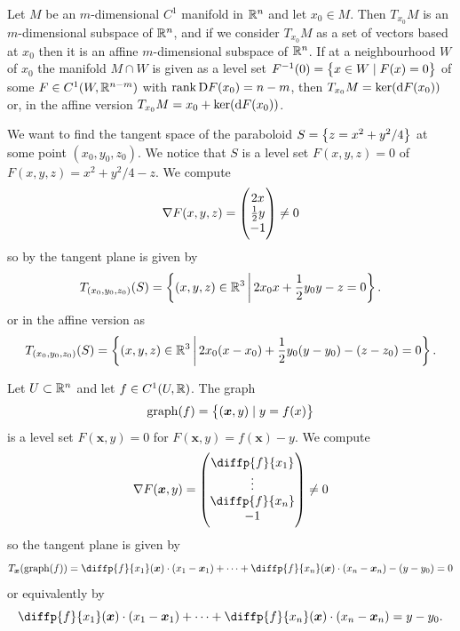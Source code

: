 \documentclass[11pt,a4paper]{article}
\begin{document}
\begin{proposition}
  \label{prop:tangent-space-computation-theorem}
  Let $M$ be an $m$-dimensional $C^1$ manifold in $\mathbb{R}^n$ and let $x_0 \in M$.
  Then $T_{x_0} M$ is an $m$-dimensional subspace of $\mathbb{R}^n$,
  and if we consider $T_{x_0} M$ as a set of vectors based at $x_0$ then it is
  an affine $m$-dimensional subspace of $\mathbb{R}^n$.
  If at a neighbourhood $W$ of $x_0$ the manifold $M \cap W$ is
  given as a level set $F^{-1}(0) = \left\{x \in W \mid F(x) = 0\right\}$
  of some $F \in C^1(W,\mathbb{R}^{n - m})$ with $\operatorname{rank} \mathrm{D} F(x_0) = n - m$,
  then $T_{x_0} M = \ker(\mathrm{d} F(x_0))$ or,
  in the affine version $T_{x_0} M = x_0 + \ker(\mathrm{d} F(x_0))$.
\end{proposition}

\begin{example}
  We want to find the tangent space of the paraboloid
  $S = \left\{z = x^2 + y^2/4\right\}$ at some point $(x_0,y_0,z_0)$.
  We notice that $S$ is a level set $F(x,y,z) = 0$
  of $F(x,y,z) = x^2 + y^2/4 - z$.
  We compute
  \[
    \nabla F(x,y,z) =
    \begin{pmatrix}
      2x \\ \frac{1}{2} y \\ -1
    \end{pmatrix} \neq 0
  \]
  so by 
  the tangent plane is given by
  \[
    T_{(x_0,y_0,z_0)}(S) =
    \left\{(x,y,z) \in \mathbb{R}^3 \,\middle\vert\, 2x_0 x + \frac{1}{2} y_0 y - z = 0\right\}.
  \]
  or in the affine version as
  \[
    T_{(x_0,y_0,z_0)}(S) =
    \left\{(x,y,z) \in \mathbb{R}^3 \,\middle\vert\,
      2x_0 (x - x_0) + \frac{1}{2} y_0(y - y_0) - (z - z_0) = 0\right\}.
  \]
\end{example}

\begin{example}
  Let $U \subset \mathbb{R}^n$ and let $f \in C^1(U,\mathbb{R})$.
  The graph
  \[
    \operatorname{graph}(f) = \left\{(\boldsymbol x, y) \mid y = f(x)\right\}
  \]
  is a level set $F(\boldsymbol x,y) = 0$ for $F(\boldsymbol x,y) = f(\boldsymbol x) - y$.
  We compute
  \[
    \nabla F(\boldsymbol x,y) =
    \begin{pmatrix}
      \diffp{f}{{x_1}} \\ \vdots \\ \diffp{f}{{x_n}} \\ -1
    \end{pmatrix} \neq 0
  \]
  so the tangent plane is given by
  \[
    T_{\boldsymbol x}(\graph(f)) =
    \diffp{f}{{x_1}}(\boldsymbol x) \cdot (x_1 - \boldsymbol x_1) + \cdots +
    \diffp{f}{{x_n}}(\boldsymbol x) \cdot (x_n - \boldsymbol x_n) - (y - y_0) = 0
  \]
  or equivalently by
  \[
    \diffp{f}{{x_1}}(\boldsymbol x) \cdot (x_1 - \boldsymbol x_1) + \cdots +
    \diffp{f}{{x_n}}(\boldsymbol x) \cdot (x_n - \boldsymbol x_n) = y - y_0.
  \]
\end{example}
\end{document}
